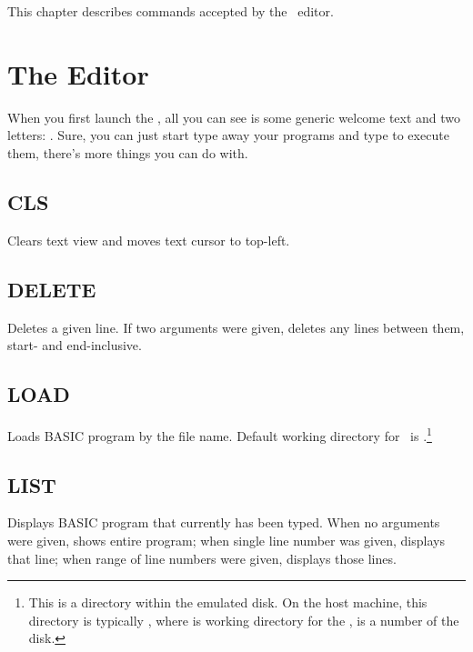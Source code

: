 This chapter describes commands accepted by the \tbas\ editor.

\section{The Editor}

When you first launch the \tbas, all you can see is some generic welcome text and two letters: . Sure, you can just start type away your programs and type  to execute them, there's more things you can do with.

\subsection{CLS}
    \par
    Clears text view and moves text cursor to top-left.

\subsection{DELETE}
    \par
    Deletes a given line. If two arguments were given, deletes any lines between them, start- and end-inclusive.

\subsection{LOAD}
    \par
    Loads BASIC program by the file name. Default working directory for \tbas\ is .\footnote{This is a directory within the emulated disk. On the host machine, this directory is typically , where  is working directory for the \thismachine,  is a number of the disk.}
    
\subsection{LIST}
    \par
    Displays BASIC program that currently has been typed. When no arguments were given, shows entire program; when single line number was given, displays that line; when range of line numbers were given, displays those lines.
    
